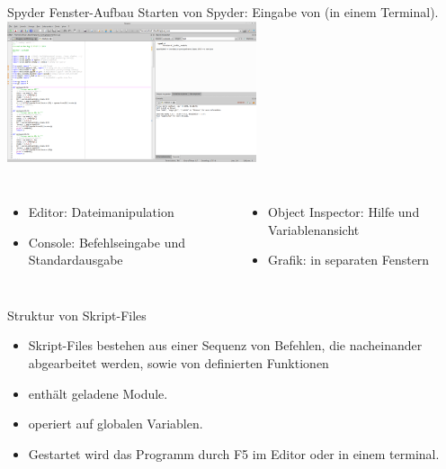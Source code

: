 \documentclass[hyperref={xetex}]{beamer}
\begin{document}
\begin{frame}[fragile]{Spyder Fenster-Aufbau}
Starten von Spyder: Eingabe von  (in einem Terminal).
\centering\includegraphics[width=0.55\textwidth]{figures/Screenshot_spyder}

\begin{columns}[c]
\begin{itemize}
\item \alert{Editor:} Dateimanipulation
\item \alert{Console:} Befehlseingabe und Standardausgabe
\end{itemize}
\begin{itemize}
\item \alert{Object Inspector:} Hilfe und Variablenansicht  
\item \alert{Grafik:} in separaten Fenstern
\end{itemize}

\end{columns}
\end{frame}

\begin{frame}[fragile]{Struktur von Skript-Files}
\begin{itemize}
\item Skript-Files bestehen aus einer Sequenz von Befehlen, die
  nacheinander abgearbeitet werden, sowie von definierten Funktionen
\item enthält geladene Module.
\item operiert auf globalen Variablen.

\item Gestartet wird das Programm  durch F5 im Editor oder in einem terminal.

\end{itemize}
\end{frame}
\end{document}
